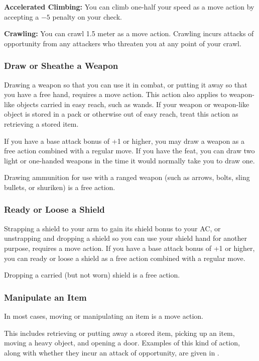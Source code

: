 \textbf{Accelerated Climbing:} You can climb one-half your speed as a move action by accepting a $-5$ penalty on your  check.

\textbf{Crawling:} You can crawl 1.5 meter as a move action. Crawling incurs attacks of opportunity from any attackers who threaten you at any point of your crawl.

\subsubsection{Draw or Sheathe a Weapon}
Drawing a weapon so that you can use it in combat, or putting it away so that you have a free hand, requires a move action. This action also applies to weapon-like objects carried in easy reach, such as wands. If your weapon or weapon-like object is stored in a pack or otherwise out of easy reach, treat this action as retrieving a stored item.

If you have a base attack bonus of +1 or higher, you may draw a weapon as a free action combined with a regular move. If you have the  feat, you can draw two light or one-handed weapons in the time it would normally take you to draw one.

Drawing ammunition for use with a ranged weapon (such as arrows, bolts, sling bullets, or shuriken) is a free action.

\subsubsection{Ready or Loose a Shield}
Strapping a shield to your arm to gain its shield bonus to your AC, or unstrapping and dropping a shield so you can use your shield hand for another purpose, requires a move action. If you have a base attack bonus of +1 or higher, you can ready or loose a shield as a free action combined with a regular move.

Dropping a carried (but not worn) shield is a free action.

\subsubsection{Manipulate an Item}
In most cases, moving or manipulating an item is a move action.

This includes retrieving or putting away a stored item, picking up an item, moving a heavy object, and opening a door. Examples of this kind of action, along with whether they incur an attack of opportunity, are given in .

